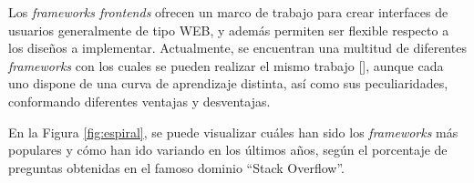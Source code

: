

Los \textit{frameworks frontends} ofrecen un marco de trabajo para crear interfaces de usuarios generalmente de tipo WEB, y además permiten ser flexible respecto a los diseños a implementar. Actualmente, se encuentran una multitud de diferentes \textit{frameworks} con los cuales se pueden realizar el mismo trabajo [\cite{48,53}], aunque cada uno dispone de una curva de aprendizaje distinta, así como sus peculiaridades, conformando diferentes ventajas y desventajas.

En la Figura \ref{fig:espiral}, se puede visualizar cuáles han sido los \textit{frameworks} más populares y cómo han ido variando en los últimos años, según el porcentaje de preguntas obtenidas en el famoso dominio ``Stack Overflow''.


